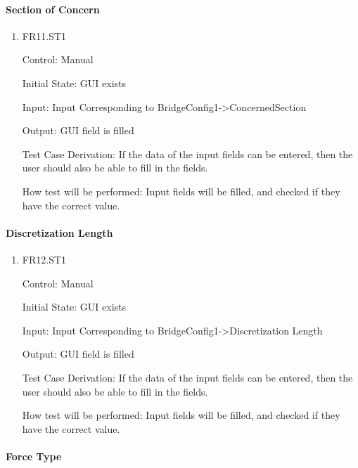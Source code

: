 \documentclass[12pt, titlepage]{article}
\begin{document}
\paragraph{Section of Concern}

\begin{enumerate}

  \item{FR11.ST1\\}

  Control: Manual
            
  Initial State: GUI exists
            
  Input: Input Corresponding to BridgeConfig1->ConcernedSection
            
  Output: GUI field is filled

  Test Case Derivation: If the data of the input fields can be entered, then the user should also be able to fill in the fields.

  How test will be performed: Input fields will be filled, and checked if they have the correct value. 
					
\end{enumerate}

\paragraph{Discretization Length}

\begin{enumerate}

  \item{FR12.ST1\\}

Control: Manual
					
Initial State: GUI exists
					
Input: Input Corresponding to BridgeConfig1->Discretization Length
					
Output: GUI field is filled

Test Case Derivation: If the data of the input fields can be entered, then the user should also be able to fill in the fields.

How test will be performed: Input fields will be filled, and checked if they have the correct value. 

\end{enumerate}

\paragraph{Force Type}
\end{document}
